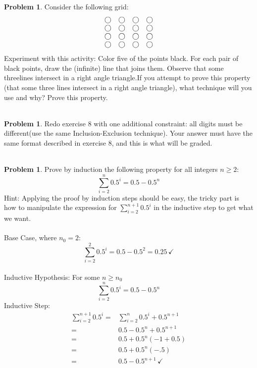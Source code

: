 \documentclass[10pt,leqno ]{article}
\theoremstyle{definition}
\newtheorem{problem}[theorem]{Problem}
\begin{document}
\begin{problem} Consider the following grid:
\begin{displaymath}
\begin{array}{c c c c}
\bigcirc & \bigcirc & \bigcirc & \bigcirc \\
\bigcirc & \bigcirc & \bigcirc & \bigcirc \\
\bigcirc & \bigcirc & \bigcirc & \bigcirc \\
\bigcirc & \bigcirc & \bigcirc & \bigcirc \\
\end{array}
\end{displaymath}
Experiment with this activity:  Color five of the points black.  For each pair of black points, draw the (infinite) line that joins them.  Observe that some threelines intersect in a right angle triangle.If you attempt to prove this property (that some three lines intersect in a right angle triangle), what technique will you use and why?  Prove this property.
\\\\
\Large
\end{problem}
\newpage

\begin{problem} Redo exercise 8 with one additional constraint:  all digits must be different(use the same Inclusion-Exclusion technique).  Your answer must have the same format described in exercise 8, and this is what will be graded.
\\\\
\Large
\end{problem}
\newpage

\begin{problem} Prove by induction the following property for all integers $n \geq 2$:
$$\sum_{i=2}^{n}0.5^i = 0.5-0.5^n$$
Hint:  Applying the proof by induction steps should be easy, the tricky part is how  to  manipulate  the  expression  for $\sum_{i=2}^{n+1}0.5^i$ in  the  inductive  step  to  get what we want.
\\\\
\Large
Base Case, where $n_0=2$:
$$\sum_{i=2}^{2}0.5^i = 0.5 - 0.5^2 = 0.25 \, \checkmark$$
\\
Inductive Hypothesis:  For some $n \geq n_0$
$$\sum_{i=2}^{n}0.5^i = 0.5-0.5^n$$
Inductive Step:
\begin{align*}
\sum_{i=2}^{n+1}0.5^i =& \sum_{i=2}^{n}0.5^i + 0.5^{n+1} \\
                      =&   0.5-0.5^n + 0.5^{n+1} \\
                      =& 0.5 + 0.5^n(-1 + 0.5)\\
                      =& 0.5 + 0.5^n(-.5)\\
                      =&   0.5 - 0.5^{n+1} \, \checkmark
\end{align*}

\end{problem}
\newpage
\end{document}
